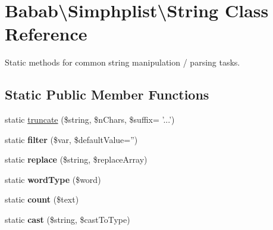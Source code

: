 \hypertarget{classBabab_1_1Simphplist_1_1String}{\section{Babab\textbackslash{}Simphplist\textbackslash{}String Class Reference}
\label{classBabab_1_1Simphplist_1_1String}
}


Static methods for common string manipulation / parsing tasks.  


\subsection*{Static Public Member Functions}
\begin{DoxyCompactItemize}
\item 
static \hyperlink{classBabab_1_1Simphplist_1_1String_a142a5a5e92a03445871984f226917b8d}{truncate} (\$string, \$n\+Chars, \$suffix= '...')
\item 
\hypertarget{classBabab_1_1Simphplist_1_1String_a3c68e6bf2659b0d2ed213a8bbb8a964c}{static {\bfseries filter} (\$var, \$default\+Value='')}\label{classBabab_1_1Simphplist_1_1String_a3c68e6bf2659b0d2ed213a8bbb8a964c}

\item 
\hypertarget{classBabab_1_1Simphplist_1_1String_ae83af1a02810785685783d31cef89d8b}{static {\bfseries replace} (\$string, \$replace\+Array)}\label{classBabab_1_1Simphplist_1_1String_ae83af1a02810785685783d31cef89d8b}

\item 
\hypertarget{classBabab_1_1Simphplist_1_1String_aba448d2953a2460635a4f760c759fc0c}{static {\bfseries word\+Type} (\$word)}\label{classBabab_1_1Simphplist_1_1String_aba448d2953a2460635a4f760c759fc0c}

\item 
\hypertarget{classBabab_1_1Simphplist_1_1String_ada07abcb49a98db46fd776c6da8c473c}{static {\bfseries count} (\$text)}\label{classBabab_1_1Simphplist_1_1String_ada07abcb49a98db46fd776c6da8c473c}

\item 
\hypertarget{classBabab_1_1Simphplist_1_1String_a108a4baabcab44ce8dd27c573d052da0}{static {\bfseries cast} (\$string, \$cast\+To\+Type)}\label{classBabab_1_1Simphplist_1_1String_a108a4baabcab44ce8dd27c573d052da0}

\end{DoxyCompactItemize}
